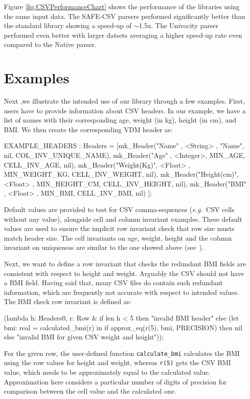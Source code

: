 \documentclass[runningheads,a4paper]{llncs}
\begin{document}
 Figure \ref{fig:CSVPerformanceChart} shows the performance of the libraries using the same input data. The SAFE-CSV parsers performed significantly better than the standard library showing a speed-up of $\sim$1.5x. The Univocity parser performed even better with larger datsets averaging a higher speed-up rate even compared to the Native parser.

\section{Examples}\label{sec:Examples}

Next ,we illustrate the intended use of our library through a few examples. First, users have to provide information about CSV headers. In our example, we have a list of names with their corresponding age, weight (in kg), height (in cm), and BMI. We then create the corresponding VDM header as:
%
\begin{vdmsl}[frame=none,basicstyle=\ttfamily\scriptsize]
	EXAMPLE_HEADERS : Headers = 
        [mk_Header("Name"      , <String> ,  "Name", nil, COL_INV_UNIQUE_NAME),
         mk_Header("Age"       , <Integer>,       MIN_AGE, CELL_INV_AGE, nil),
         mk_Header("Weight(Kg)", <Float>  , MIN_WEIGHT_KG, CELL_INV_WEIGHT, nil),
         mk_Header("Height(cm)", <Float>  , MIN_HEIGHT_CM, CELL_INV_HEIGHT, nil),
         mk_Header("BMI"       , <Float>  ,       MIN_BMI, CELL_INV_BMI, nil) ];
\end{vdmsl} 
%
Default values are provided to test for CSV comma-sequences (\textit{e.g.}~CSV cells without any value), alongside cell and column invariant examples. These default values are used to ensure the implicit row invariant check that row size musts match header size. The cell invariants on age, weight, height and the column invariant on uniqueness are similar to the one showed above (see~).

Next, we want to define a row invariant that checks the redundant BMI fields are consistent with respect to height and weight. Arguably the CSV should not have a BMI field. Having said that, many CSV files do contain such redundant information, which are frequently not accurate with respect to intended values. The BMI check row invariant is defined as:
%
\begin{vdmsl}[frame=none,basicstyle=\ttfamily\scriptsize]    
    (lambda h: Headers0, r: Row &
    	  if len h < 5 then "invalid BMI header"
    	  else 
		      (let bmi: real = calculated_bmi(r) in
			      if approx_eq(r(5), bmi, PRECISION) then nil 
			      else "invalid BMI for given CSV weight and height"));
\end{vdmsl}
%
For the given row, the user-defined function \texttt{calculate\_bmi} calculates the BMI using the row values for height and weight, whereas \texttt{r(5)} gets the CSV BMI value, which needs to be approximately equal to the calculated value. Approximation here considers a particular number of digits of precision for comparison between the cell value and the calculated one.    
\end{document}
